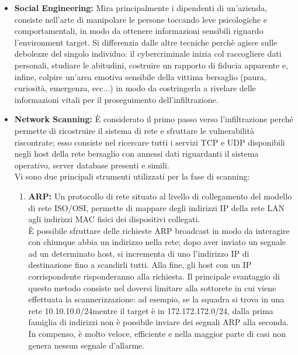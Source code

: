     \begin{itemize}
        \item \textbf{Social Engineering:} Mira principalmente i dipendenti di un'azienda, consiste nell'arte di manipolare le persone toccando leve psicologiche e comportamentali, in modo da ottenere informazioni sensibili riguardo l'environment target. Si differenzia dalle altre tecniche perchè agisce sulle debolezze del singolo individuo: il cybercriminale inizia col raccogliere dati personali, studiare le abitudini, costruire un rapporto di fiducia apparente e, infine, colpire un'area emotiva sensibile della vittima bersaglio (paura, curiosità, emergenza, ecc...) in modo da costringerla a rivelare delle informazioni vitali per il proseguimento dell'infiltrazione.
        \item \textbf{Network Scanning:} È considerato il primo passo verso l'infiltrazione perché permette di ricostruire il sistema di rete e sfruttare le vulnerabilità riscontrate; esso consiste nel ricercare tutti i servizi TCP e UDP disponibili negli host della rete bersaglio con annessi dati riguardanti il sistema operativo, server database presenti e simili.\\
        Vi sono due principali strumenti utilizzati per la fase di scanning:
        \begin{enumerate}
            \item \textbf{ARP:} Un protocollo di rete situato al livello di collegamento del modello di rete ISO/OSI, permette di mappare degli indirizzi IP della rete LAN agli indirizzi MAC fisici dei dispositivi collegati.\\
            È possibile sfruttare delle richieste ARP broadcast in modo da interagire con chiunque abbia un indirizzo nella rete; dopo aver inviato un segnale ad un determinato host, si incrementa di uno l'indirizzo IP di destinazione fino a scandirli tutti. Alla fine, gli host con un IP corrispondente risponderanno alla richiesta. Il principale svantaggio di questo metodo consiste nel doversi limitare alla sottorete in cui viene effettuata la scannerizzazione: ad esempio, se la squadra si trova in una rete 10.10.10.0/24\footnotemark mentre il target è in 172.172.172.0/24, dalla prima famiglia di indirizzi non è possibile inviare dei segnali ARP alla seconda.\\
            In compenso, è molto veloce, efficiente e nella maggior parte di casi non genera nessun segnale d'allarme.\\[1.5em]
            \begin{figure}[H]

\end{figure}
\end{enumerate}
\end{itemize}
